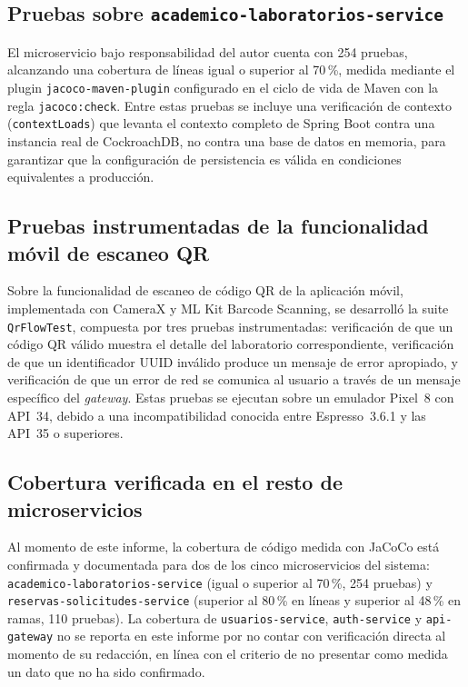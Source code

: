 \documentclass[11pt,a4paper]{article}
\begin{document}
\subsection{Pruebas sobre \texttt{academico-laboratorios-service}}

El microservicio bajo responsabilidad del autor cuenta con 254 pruebas,
alcanzando una cobertura de líneas igual o superior al 70\,\%, medida
mediante el plugin \texttt{jacoco-maven-plugin} configurado en el ciclo
de vida de Maven con la regla \texttt{jacoco:check}. Entre estas pruebas
se incluye una verificación de contexto (\texttt{contextLoads}) que
levanta el contexto completo de Spring Boot contra una instancia real de
CockroachDB, no contra una base de datos en memoria, para garantizar que
la configuración de persistencia es válida en condiciones equivalentes a
producción.

\subsection{Pruebas instrumentadas de la funcionalidad móvil de escaneo QR}

Sobre la funcionalidad de escaneo de código QR de la aplicación móvil,
implementada con CameraX y ML Kit Barcode Scanning, se desarrolló la
suite \texttt{QrFlowTest}, compuesta por tres pruebas instrumentadas:
verificación de que un código QR válido muestra el detalle del
laboratorio correspondiente, verificación de que un identificador UUID
inválido produce un mensaje de error apropiado, y verificación de que
un error de red se comunica al usuario a través de un mensaje específico
del \emph{gateway}. Estas pruebas se ejecutan sobre un emulador Pixel~8
con API~34, debido a una incompatibilidad conocida entre Espresso~3.6.1
y las API~35 o superiores.

\subsection{Cobertura verificada en el resto de microservicios}

Al momento de este informe, la cobertura de código medida con JaCoCo
está confirmada y documentada para dos de los cinco microservicios del
sistema: \texttt{academico-laboratorios-service} (igual o superior al
70\,\%, 254 pruebas) y \texttt{reservas-solicitudes-service} (superior
al 80\,\% en líneas y superior al 48\,\% en ramas, 110 pruebas). La
cobertura de \texttt{usuarios-service}, \texttt{auth-service} y
\texttt{api-gateway} no se reporta en este informe por no contar con
verificación directa al momento de su redacción, en línea con el
criterio de no presentar como medida un dato que no ha sido confirmado.
\end{document}

